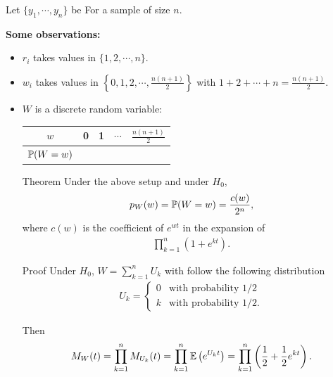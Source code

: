 \begin{frame}[fragile]

	\begin{center}
	Let $\{y_1,\cdots,y_n\}$  be For a sample of size $n$.
	\end{center}
\vfill
{\bf Some observations:}
\bigskip
\begin{itemize}
	\item $r_i$ takes values in $\{1,2,\cdots, n\}$.
		\bigskip
	\item $w_i$ takes values in $\left\{0,1,2,\cdots, \frac{n(n+1)}{2}\right\}$ with $1+2+\cdots + n = \frac{n(n+1)}{2}$.
		\bigskip
	\item $W$ is a discrete random variable:
		\bigskip

		\begin{center}
		\renewcommand{\arraystretch}{1.5}
		\begin{tabular}{|c|c|c|c|c|}
			$w$         & 0 & 1 & $\cdots$ & $\frac{n(n+1)}{2}$ \\ \hline
			$\mathbb{P}(W=w)$ &   &   &          &                    \\
		\end{tabular}
		\end{center}
\end{itemize}
\end{frame}
\begin{frame}[fragile]
\begin{itemize}
	\item[Theorem] Under the above setup and under $H_0$,
	\begin{align*}
		p_W(w) = \mathbb{P}(W=w) = \frac{c(w)}{2^n},
	\end{align*}
	where $c(w)$ is the coefficient of  $e^{wt}$ in the expansion of
	 \begin{align*}
		\prod_{k=1}^n \left(1+e^{kt}\right).
	\end{align*}
	\bigskip
	\item[Proof] Under $H_0$,  $W=\sum_{k=1}^n U_k$ with follow the following distribution
	\begin{align*}
		U_k =
		\begin{cases}
			0& \text{with probability $1/2$}\\
			k& \text{with probability $1/2$}.
		\end{cases}
	\end{align*}
	\item[] Then
	\begin{align*}
		M_W(t) = \prod_{k=1}^n M_{U_k}(t) = \prod_{k=1}^n\mathbb{E}\left(e^{U_kt}\right) = \prod_{k=1}^n \left(\frac{1}{2} +\frac{1}{2}e^{kt}\right).
	\end{align*}
\end{itemize}
\end{frame}
